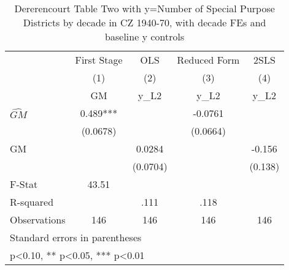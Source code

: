 \begin{table}[htbp]\centering
\def\sym#1{\ifmmode^{#1}\else\(^{#1}\)\fi}
\caption{Dererencourt Table Two with y=Number of Special Purpose Districts by decade in CZ 1940-70, with decade FEs and baseline y controls}
\begin{tabular}{l*{4}{c}}
\toprule
                    & First Stage   &         OLS   &Reduced Form   &        2SLS   \\
                    &\multicolumn{1}{c}{(1)}&\multicolumn{1}{c}{(2)}&\multicolumn{1}{c}{(3)}&\multicolumn{1}{c}{(4)}\\
                    &\multicolumn{1}{c}{GM}&\multicolumn{1}{c}{y\_L2}&\multicolumn{1}{c}{y\_L2}&\multicolumn{1}{c}{y\_L2}\\
\midrule
$\hat{GM}$          &       0.489***&               &     -0.0761   &               \\
                    &    (0.0678)   &               &    (0.0664)   &               \\
\addlinespace
GM                  &               &      0.0284   &               &      -0.156   \\
                    &               &    (0.0704)   &               &     (0.138)   \\
\midrule
F-Stat              &       43.51   &               &               &               \\
R-squared           &               &        .111   &        .118   &               \\
Observations        &         146   &         146   &         146   &         146   \\
\bottomrule
\multicolumn{5}{l}{\footnotesize Standard errors in parentheses}\\
\multicolumn{5}{l}{\footnotesize * p<0.10, ** p<0.05, *** p<0.01}\\
\end{tabular}
\end{table}

